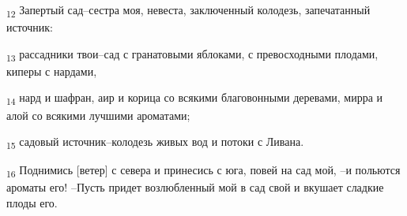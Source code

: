 \begin{tcolorbox}
\textsubscript{12} Запертый сад--сестра моя, невеста, заключенный колодезь, запечатанный источник:
\end{tcolorbox}
\begin{tcolorbox}
\textsubscript{13} рассадники твои--сад с гранатовыми яблоками, с превосходными плодами, киперы с нардами,
\end{tcolorbox}
\begin{tcolorbox}
\textsubscript{14} нард и шафран, аир и корица со всякими благовонными деревами, мирра и алой со всякими лучшими ароматами;
\end{tcolorbox}
\begin{tcolorbox}
\textsubscript{15} садовый источник--колодезь живых вод и потоки с Ливана.
\end{tcolorbox}
\begin{tcolorbox}
\textsubscript{16} Поднимись [ветер] с севера и принесись с юга, повей на сад мой, --и польются ароматы его! --Пусть придет возлюбленный мой в сад свой и вкушает сладкие плоды его.
\end{tcolorbox}
